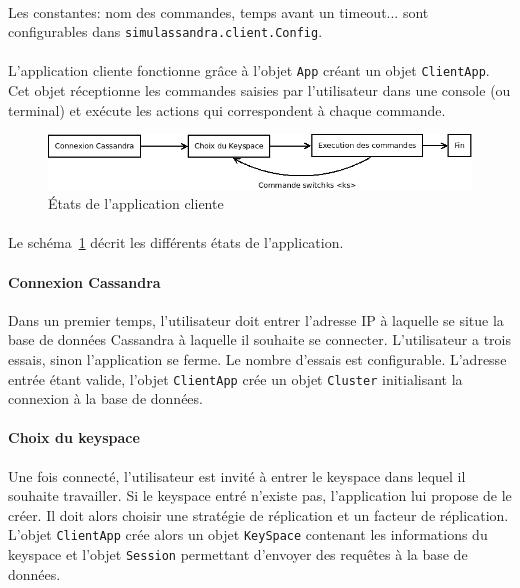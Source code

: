 \documentclass[12pt]{article}
\newcommand{\class}[1]{\texttt{#1}}
\begin{document}
\paragraph{} Les constantes: nom des commandes, temps avant un timeout... sont configurables dans \class{simulassandra.client.Config}.

\paragraph{}L'application cliente fonctionne grâce à l'objet \class{App} créant un objet \class{ClientApp}.
Cet objet réceptionne les commandes saisies par l'utilisateur dans une console (ou terminal) et exécute les actions qui correspondent à chaque commande.

\begin{figure}[h]
	\centering
		\includegraphics[width=13cm]{images/client/vie.png}
	\caption{États de l'application cliente \label{fig:vie}}
\end{figure}

\paragraph{} Le schéma~\ref{fig:vie} décrit les différents états de l'application.

\paragraph{Connexion Cassandra} Dans un premier temps, l'utilisateur doit entrer l'adresse IP à laquelle se situe la base de données Cassandra à laquelle il souhaite se connecter.
L'utilisateur a trois essais, sinon l'application se ferme. Le nombre d'essais est configurable. L'adresse entrée étant valide, 
l'objet \class{ClientApp} crée un objet \class{Cluster} initialisant la connexion à la base de données.

\paragraph{Choix du keyspace} Une fois connecté, l'utilisateur est invité à entrer le keyspace dans lequel il souhaite travailler. Si le keyspace entré n'existe pas, l'application lui propose de le créer. Il doit alors choisir une stratégie de réplication et un facteur de réplication.
L'objet \class{ClientApp} crée alors un objet \class{KeySpace} contenant les informations du keyspace et l'objet \class{Session} permettant d'envoyer des requêtes à la base de données.
\end{document}
